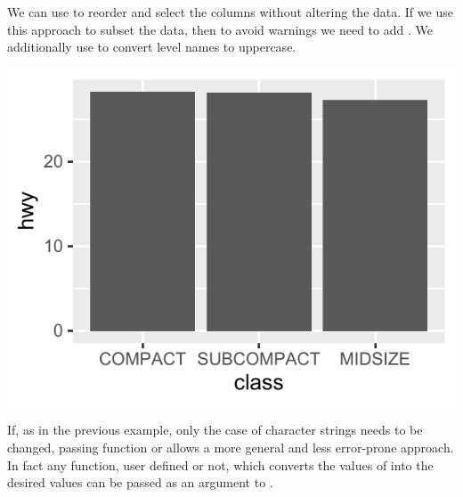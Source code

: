 \documentclass[krantz2]{krantz}\usepackage{knitr}
\begin{document}
We can use  to reorder and select the columns without altering the data. If we use this approach to subset the data, then to avoid warnings we need to add . We additionally use  to convert level names to uppercase.


\begin{knitrout}\footnotesize
{}\color{fgcolor}\begin{kframe}
\begin{alltt}
  \hlopt{+}
  \hlstd{(} \hlstd{=} \hlstd{,}    \hlstd{=} \hlstd{)} \hlopt{+}
  \hlstd{(} \hlstd{=} \hlstd{(}\hlstd{,} \hlstd{,} \hlstd{),}
                    \hlstd{=} \hlstd{(}\hlstd{,} \hlstd{,} \hlstd{))}
\end{alltt}
\end{kframe}

{\centering \includegraphics[width=.54\textwidth]{figure/pos-scale-discrete-10-1} 

}



\end{knitrout}

If, as in the previous example, only the case of character strings needs to be changed, passing function  or  allows a more general and less error-prone approach. In fact any function, user defined or not, which converts the values of  into the desired values can be passed as an argument to .

\begin{knitrout}\footnotesize
{}\color{fgcolor}\begin{kframe}
\begin{alltt}
  \hlstd{(} \hlstd{=} \hlstd{(}\hlstd{,} \hlstd{,} \hlstd{),}
                    
\end{alltt}
\end{kframe}
\end{knitrout}
\end{document}
